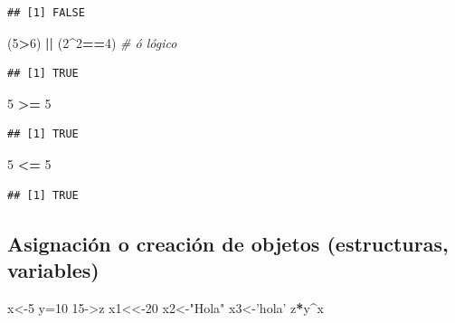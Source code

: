 \documentclass[
]{book}
\newenvironment{Shaded}{\begin{snugshade}}{\end{snugshade}}
\newcommand{\CommentTok}[1]{\textcolor[rgb]{0.56,0.35,0.01}{\textit{#1}}}
\newcommand{\DecValTok}[1]{\textcolor[rgb]{0.00,0.00,0.81}{#1}}
\newcommand{\NormalTok}[1]{#1}
\newcommand{\OperatorTok}[1]{\textcolor[rgb]{0.81,0.36,0.00}{\textbf{#1}}}
\newcommand{\StringTok}[1]{\textcolor[rgb]{0.31,0.60,0.02}{#1}}
\begin{document}
\begin{verbatim}
## [1] FALSE
\end{verbatim}

\begin{Shaded}
\begin{Highlighting}[]
\NormalTok{(}\DecValTok{5}\OperatorTok{>}\DecValTok{6}\NormalTok{) }\OperatorTok{||}\StringTok{ }\NormalTok{(}\DecValTok{2}\OperatorTok{^}\DecValTok{2}\OperatorTok{==}\DecValTok{4}\NormalTok{) }\CommentTok{# ó lógico}
\end{Highlighting}
\end{Shaded}

\begin{verbatim}
## [1] TRUE
\end{verbatim}

\begin{Shaded}
\begin{Highlighting}[]
\DecValTok{5} \OperatorTok{>=}\StringTok{ }\DecValTok{5}
\end{Highlighting}
\end{Shaded}

\begin{verbatim}
## [1] TRUE
\end{verbatim}

\begin{Shaded}
\begin{Highlighting}[]
\DecValTok{5} \OperatorTok{<=}\StringTok{ }\DecValTok{5}
\end{Highlighting}
\end{Shaded}

\begin{verbatim}
## [1] TRUE
\end{verbatim}

\hypertarget{asignaciuxf3n-o-creaciuxf3n-de-objetos-estructuras-variables}{%
\subsection{Asignación o creación de objetos (estructuras, variables)}\label{asignaciuxf3n-o-creaciuxf3n-de-objetos-estructuras-variables}}

\begin{Shaded}
\begin{Highlighting}[]
\NormalTok{x<-}\DecValTok{5}
\NormalTok{y=}\DecValTok{10}
\DecValTok{15}\NormalTok{->z}
\NormalTok{x1<<-}\DecValTok{20}
\NormalTok{x2<-}\StringTok{"Hola"}
\NormalTok{x3<-}\StringTok{'hola'}
\NormalTok{z}\OperatorTok{*}\NormalTok{y}\OperatorTok{^}\NormalTok{x}
\end{Highlighting}
\end{Shaded}
\end{document}
